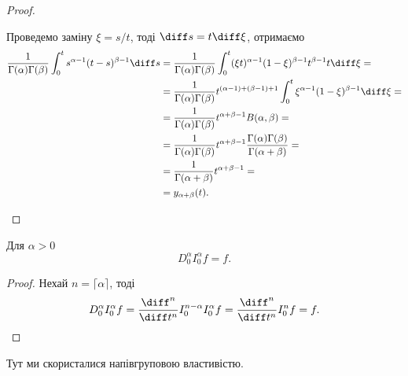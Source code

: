 \begin{proof}
\begin{enumerate}
        Проведемо заміну $\xi = s / t$, тоді $\diff s = t \diff \xi$, отримаємо
        \begin{equation}
            \begin{aligned}
                \frac{1}{\Gamma(\alpha) \Gamma(\beta)} \int_0^t s^{\alpha - 1} (t - s)^{\beta - 1} \diff s
                &= \frac{1}{\Gamma(\alpha) \Gamma(\beta)} \int_0^t (\xi t)^{\alpha - 1} (1 - \xi)^{\beta - 1} t^{\beta - 1} t \diff \xi = \\
                &= \frac{1}{\Gamma(\alpha) \Gamma(\beta)} t^{(\alpha - 1) + (\beta - 1) + 1} \int_0^t \xi^{\alpha - 1} (1 - \xi)^{\beta - 1} \diff \xi = \\
                &= \frac{1}{\Gamma(\alpha) \Gamma(\beta)} t^{\alpha + \beta - 1} B(\alpha, \beta) = \\
                &= \frac{1}{\Gamma(\alpha) \Gamma(\beta)} t^{\alpha + \beta - 1} \frac {\Gamma (\alpha) \Gamma (\beta)}{\Gamma (\alpha + \beta)} = \\
                &= \frac{1}{\Gamma (\alpha + \beta)} t^{\alpha + \beta - 1} = \\
                &= y_{\alpha + \beta}(t).
            \end{aligned}
        \end{equation}
    \end{enumerate}
\end{proof}

\begin{theorem}
    Для $\alpha > 0$
    \begin{equation}
        D_0^\alpha I_0^\alpha f = f.
    \end{equation}
\end{theorem}
\begin{proof}
    Нехай $n = \lceil \alpha \rceil$, тоді
    \begin{equation}
        D_0^\alpha I_0^\alpha f = \frac{\diff^n}{\diff t^n} I_0^{n - \alpha} I_0^{\alpha} f = \frac{\diff^n}{\diff t^n} I_0^n f = f. 
    \end{equation}
\end{proof}
\begin{remark}
    Тут ми скористалися напівгруповою властивістю.
\end{remark}


